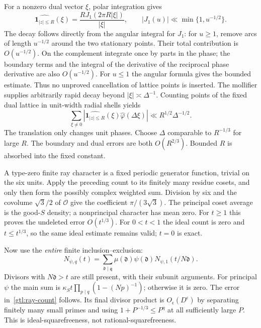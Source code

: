 For a nonzero dual vector $\xi$, polar integration gives
\begin{equation}\label{gtl:disk-fourier}
 \widehat{\mathbf1_{|z|\le R}}(\xi)
       =\frac{R J_1(2\pi R|\xi|)}{|\xi|},
 \qquad
 |J_1(u)|\ll\min\{1,u^{-1/2}\}.
\end{equation}
The decay follows directly from the angular integral for $J_1$:
for $u\ge1$, remove arcs of length $u^{-1/2}$ around the two
stationary points. Their total contribution is $O(u^{-1/2})$.
On the complement integrate once by parts in the phase;
the boundary terms and the integral of the derivative of
the reciprocal phase derivative are also $O(u^{-1/2})$.
For $u\le1$ the angular formula gives the bounded estimate.
Thus no unproved cancellation of lattice points is inserted.
The mollifier supplies arbitrarily rapid decay beyond
$|\xi|\asymp\Delta^{-1}$. Counting points of the fixed dual
lattice in unit-width radial shells yields
\begin{equation}\label{gtl:disk-error}
 \sum_{\xi\ne0}
    |\widehat{\mathbf1_{|z|\le R}}(\xi)\widehat\varphi(\Delta\xi)|
 \ll R^{1/2}\Delta^{-1/2}.
\end{equation}
The translation only changes unit phases.
Choose $\Delta$ comparable to $R^{-1/3}$ for large $R$.
The boundary and dual errors are both $O(R^{2/3})$.
Bounded $R$ is absorbed into the fixed constant.

A type-zero finite ray character is a fixed periodic generator
function, trivial on the six units. Apply the preceding count
to its finitely many residue cosets, and only then form the
possibly complex weighted sum. Division by six and the
covolume $\sqrt3/2$ of $\mathcal O$ give the coefficient
$\pi/(3\sqrt3)$. The principal coset average is the good-$S$
density; a nonprincipal character has mean zero.
For $t\ge1$ this proves the undeleted error $O(t^{1/3})$.
For $0<t<1$ the ideal count is zero and $t\le t^{1/3}$,
so the same ideal estimate remains valid; $t=0$ is exact.

Now use the \emph{entire} finite inclusion--exclusion:
\begin{equation}\label{gtl:full-IE}
 N_{\psi,q}(t)
  =\sum_{\mathfrak d\mid\mathfrak q}
       \mu(\mathfrak d)\psi(\mathfrak d)
                       N_{\psi,1}(t/N\mathfrak d).
\end{equation}
Divisors with $N\mathfrak d>t$ are still present, with their
subunit arguments. For principal $\psi$ the main sum is
$\kappa_St\prod_{p\mid q}(1-(Np)^{-1})$; otherwise it is zero.
The error in~\eqref{gtl:ray-count} follows. Its final divisor
product is $O_\epsilon(D^\epsilon)$ by separating finitely
many small primes and using $1+P^{-1/3}\le P^\eta$ at all
sufficiently large $P$. This is ideal-squarefreeness, not
rational-squarefreeness.

